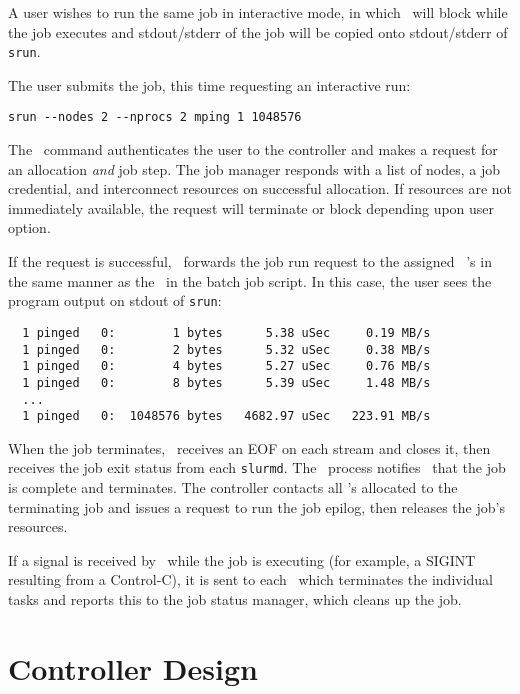 A user wishes to run the same job in interactive mode, in which \srun\
will block while the job executes and stdout/stderr of the job will be 
copied onto stdout/stderr of {\tt srun}.

The user submits the job, this time requesting an interactive run:
\begin{verbatim}
srun --nodes 2 --nprocs 2 mping 1 1048576
\end{verbatim}

The \srun\ command authenticates the user to the controller and
makes a request for an allocation {\em and} job step. The job manager
responds with a list of nodes, a job credential, and interconnect
resources on successful allocation. If resources are not immediately
available, the request will terminate or block depending upon user
option.

If the request is successful, \srun\ forwards the job run request
to the assigned \slurmd~'s in the same manner as the \srun\ in the
batch job script. In this case, the user sees the program output on 
stdout of {\tt srun}:

\begin{verbatim}
  1 pinged   0:        1 bytes      5.38 uSec     0.19 MB/s                     
  1 pinged   0:        2 bytes      5.32 uSec     0.38 MB/s                     
  1 pinged   0:        4 bytes      5.27 uSec     0.76 MB/s                     
  1 pinged   0:        8 bytes      5.39 uSec     1.48 MB/s                     
  ...
  1 pinged   0:  1048576 bytes   4682.97 uSec   223.91 MB/s              
\end{verbatim}

When the job terminates, \srun\ receives an EOF on each stream and
closes it, then receives the job exit status from each {\tt slurmd}.
The \srun\ process notifies \slurmctld\ that the job is complete 
and terminates. The controller contacts all \slurmd 's allocated to the
terminating job and issues a request to run the job epilog, then releases
the job's resources.

If a signal is received by \srun\ while the job is executing (for example,
a SIGINT resulting from a Control-C), it is sent to each \slurmd\ which 
terminates the individual tasks and reports this to the job status manager,
which cleans up the job.

\section{Controller Design}

